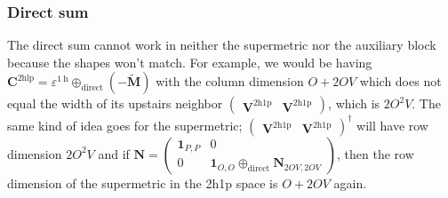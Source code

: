 \subsubsection{Direct sum}
The direct sum cannot work in neither the supermetric nor the auxiliary block because the shapes won't match. For example, we would be having $\mathbf{C}^{2 \mathrm{hlp}}=\varepsilon^{1 \mathrm{~h}} \oplus_{\text{direct}}(-\tilde{\mathbf{M}})$ with the column dimension $O+2OV$ which does not equal the width of its upstairs neighbor $\begin{pmatrix}
    \bm{V}^{2\mathrm{h1p}} & \bm{V}^{2\mathrm{h1p}}
\end{pmatrix}$, which is $2O^2V$. The same kind of idea goes for the supermetric; $\begin{pmatrix}
    \bm{V}^{2\mathrm{h1p}} & \bm{V}^{2\mathrm{h1p}}
\end{pmatrix}^\dag$ will have row dimension $2O^2V$ and if $\mathcal{\bm{N}}=\begin{pmatrix}
    \bm{1}_{P,P} & 0 \\
    0 & \bm{1}_{O,O} \oplus_{\text{direct}} \bm{N}_{2OV,2OV}
\end{pmatrix}$, then the row dimension of the supermetric in the 2h1p space is $O+2OV$ again.
